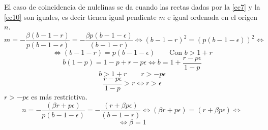 \documentclass[11pt]{article}
\begin{document}
\newpage

\noindent El caso de coincidencia de nulclinas se da cuando las rectas dadas por la \autoref{ec7} y la \autoref{ec10} son iguales, es decir tienen igual pendiente $m$ e igual ordenada en el origen $n$.
\begin{equation*}
m=-\dfrac{\beta(b-1-r)}{p(b-1-\epsilon)}=-\dfrac{\beta p(b-1-\epsilon)}{(b-1-r)}\Longleftrightarrow (b-1-r)^2=(p(b-1-\epsilon))^2 \Longleftrightarrow
\end{equation*}
\begin{equation*}
\Longleftrightarrow (b-1-r)=p(b-1-\epsilon) \qquad \text{Con $b>1+r$}
\end{equation*}
\begin{equation*}
b(1-p)=1-p+r-p\epsilon \Longleftrightarrow b=1+\dfrac{r-p\epsilon}{1-p}
\end{equation*}
\begin{equation*}
b>1+r\qquad r>-p\epsilon
\end{equation*}
\begin{equation*}
\dfrac{r-p\epsilon}{1-p}>r\Longleftrightarrow r>\epsilon
\end{equation*}
$r>-p\epsilon$ es más restrictiva.\\

\begin{equation*}
n=-\dfrac{(\beta r+p\epsilon)}{p(b-1-\epsilon)}=-\dfrac{(r+\beta p\epsilon)}{(b-1-r)}\Longleftrightarrow (\beta r+p\epsilon)=(r+\beta p\epsilon) \Longleftrightarrow 
\end{equation*}
\begin{equation*}
\Longleftrightarrow \beta =1
\end{equation*}
\end{document}
